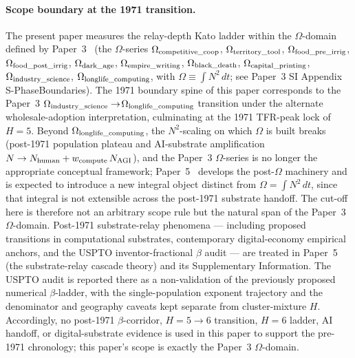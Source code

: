 \paragraph{Scope boundary at the 1971 transition.}
The present paper measures the relay-depth Kato ladder within the \(\Omega\)-domain defined by Paper~3~\cite{Kato2026c} (the \(\Omega\)-series \(\Omega_{\rm competitive\_coop}\), \(\Omega_{\rm territory\_tool}\), \(\Omega_{\rm food\_pre\_irrig}\), \(\Omega_{\rm food\_post\_irrig}\), \(\Omega_{\rm dark\_age}\), \(\Omega_{\rm empire\_writing}\), \(\Omega_{\rm black\_death}\), \(\Omega_{\rm capital\_printing}\),\linebreak \(\Omega_{\rm industry\_science}\), \(\Omega_{\rm longlife\_computing}\), with \(\Omega\equiv \int N^{2}\,dt\); see Paper~3 SI Appendix S-Phase\linebreak Boundaries). The 1971 boundary spine of this paper corresponds to the Paper~3 \(\Omega_{\rm industry\_science}\to\)\linebreak \(\Omega_{\rm longlife\_computing}\) transition under the alternate wholesale-adoption interpretation, culminating at the 1971 TFR-peak lock of \(H=5\). Beyond \(\Omega_{\rm longlife\_computing}\), the \(N^{2}\)-scaling on which \(\Omega\) is built breaks (post-1971 population plateau and AI-substrate amplification \(N\to N_{\rm human}+w_{\rm compute}\,N_{\rm AGI}\)), and the Paper~3 \(\Omega\)-series is no longer the appropriate conceptual framework; Paper~5~\cite{Kato2026e} develops the post-\(\Omega\) machinery and is expected to introduce a new integral object distinct from \(\Omega=\int N^{2}\,dt\), since that integral is not extensible across the post-1971 substrate handoff. The cut-off here is therefore not an arbitrary scope rule but the natural span of the Paper~3 \(\Omega\)-domain. Post-1971 substrate-relay phenomena --- including proposed transitions in computational substrates, contemporary digital-economy empirical anchors, and the USPTO inventor-fractional \(\beta\) audit --- are treated in Paper~5~\cite{Kato2026e} (the substrate-relay cascade theory) and its Supplementary Information. The USPTO audit is reported there as a non-validation of the previously proposed numerical \(\beta\)-ladder, with the single-population exponent trajectory and the denominator and geography caveats kept separate from cluster-mixture \(H\). Accordingly, no post-1971 \(\beta\)-corridor, \(H=5\to6\) transition, \(H=6\) ladder, AI handoff, or digital-substrate evidence is used in this paper to support the pre-1971 chronology; this paper's scope is exactly the Paper~3 \(\Omega\)-domain.

